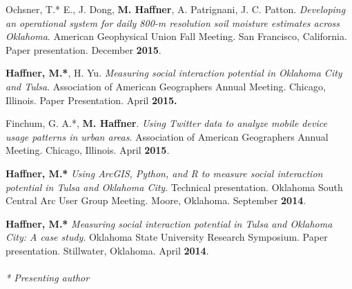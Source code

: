 \begin{cventries}
   \cventry
      {}
      {}
      {}
      {}
      {
        \begin{cvitems}
          \vspace{-2mm}
            \item {Ochsner, T.* E., J. Dong, \textbf{M. Haffner}, A. Patrignani, J. C. Patton. \textit{Developing an operational system for daily 800-m resolution soil moisture estimates across Oklahoma}. American Geophysical Union Fall Meeting. San Francisco, California. Paper presentation. December \textbf{2015}.} 
            \end{cvitems}
            }

   \cventry
      {}
      {}
      {}
      {}
      {
        \begin{cvitems}
          \vspace{-2mm}
            \item {\textbf{Haffner, M.*}, H. Yu. \textit{Measuring social interaction potential in Oklahoma City and Tulsa}. Association of American Geographers Annual Meeting. Chicago, Illinois. Paper Presentation. April \textbf{2015.}} 
              \end{cvitems}
              }

   \cventry
      {}
      {}
      {}
      {}
      {
        \begin{cvitems}
          \vspace{-2mm}
            \item {Finchum, G. A.*, \textbf{M. Haffner}. \textit{Using Twitter data to analyze mobile device usage patterns in urban areas}. Association of American Geographers Annual Meeting. Chicago, Illinois. April \textbf{2015}.}  
              \end{cvitems}
            }

   \cventry
      {}
      {}
      {}
      {}
      {
        \begin{cvitems}
          \vspace{-2mm}
            \item {\textbf{Haffner, M.*} \textit{Using ArcGIS, Python, and R to measure social interaction potential in Tulsa and Oklahoma City}. Technical presentation. Oklahoma South Central Arc User Group Meeting. Moore, Oklahoma. September \textbf{2014}.} 
            \end{cvitems}
            }

   \cventry
      {}
      {}
      {}
      {}
      {
        \begin{cvitems}
          \vspace{-2mm}
            \item {\textbf{Haffner, M.*} \textit{Measuring social interaction potential in Tulsa and Oklahoma City: A case study}. Oklahoma State University Research Symposium. Paper presentation. Stillwater, Oklahoma. April \textbf{2014}.} \\\\
            \textit{* Presenting author}
              \end{cvitems}
            }

\end{cventries}